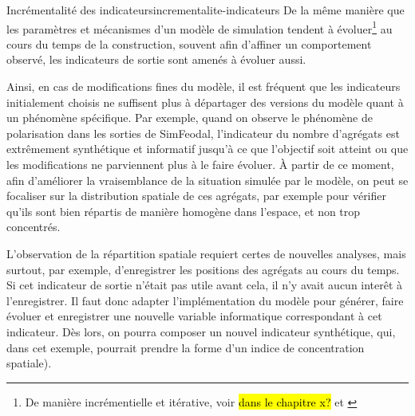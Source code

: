\begin{encadre}{Incrémentalité des indicateurs}{incrementalite-indicateurs}
\renewcommand{\thempfootnote}{\alph{mpfootnote}}
De la même manière que les paramètres et mécanismes d'un modèle de simulation tendent à évoluer\footnote{
	De manière incrémentielle et itérative, voir \hl{dans le chapitre x?} et \cite[\url{http://itsadeliverything.com/revisiting-the-iterative-incremental-mona-lisa}]{thomas_revisiting_2012}
} au cours du temps de la construction, souvent afin d'affiner un comportement observé, les indicateurs de sortie sont amenés à évoluer aussi.

Ainsi, en cas de modifications fines du modèle, il est fréquent que les indicateurs initialement choisis ne suffisent plus à départager des versions du modèle quant à un phénomène spécifique.
Par exemple, quand on observe le phénomène de polarisation dans les sorties de SimFeodal, l'indicateur du nombre d'agrégats est extrêmement synthétique et informatif jusqu'à ce que l'objectif soit atteint ou que les modifications ne parviennent plus à le faire évoluer.
À partir de ce moment, afin d'améliorer la vraisemblance de la situation simulée par le modèle, on peut se focaliser sur la distribution spatiale de ces agrégats, par exemple pour vérifier qu'ils sont bien répartis de manière homogène dans l'espace, et non trop concentrés.

L'observation de la répartition spatiale requiert certes de nouvelles analyses, mais surtout, par exemple, d'enregistrer les positions des agrégats au cours du temps.
Si cet indicateur de sortie n'était pas utile avant cela, il n'y avait aucun interêt à l'enregistrer.
Il faut donc adapter l'implémentation du modèle pour générer, faire évoluer et enregistrer une nouvelle variable informatique correspondant à cet indicateur.
Dès lors, on pourra composer un nouvel indicateur synthétique, qui, dans cet exemple, pourrait prendre la forme d'un indice de concentration spatiale).


\end{encadre}
